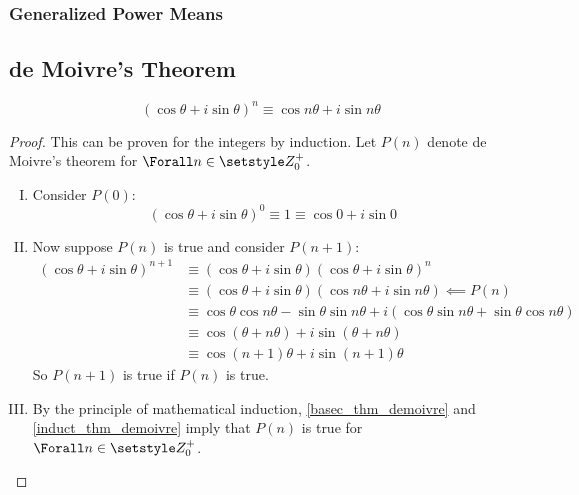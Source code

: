 \subsubsection{Generalized Power Means}

\subsection{de Moivre's Theorem}

\begin{theorem}
 \begin{equation*}
  (\cos \theta + i \sin \theta)^n \equiv \cos n\theta + i \sin n\theta
 \end{equation*}
\end{theorem}
\begin{proof}
 This can be proven for the integers by induction. Let \(P(n)\) denote de
 Moivre's theorem for \(\Forall n \in \Integers_0^+\).
 \begin{enumerate}[I.]
  \item \label{basec_thm_demoivre} Consider \(P(0)\):
        \begin{equation*}
         (\cos \theta + i \sin \theta)^0 \equiv 1 \equiv \cos 0 + i \sin 0
        \end{equation*}
  \item \label{induct_thm_demoivre} Now suppose \(P(n)\) is true and consider
        \(P(n + 1)\):
        \begin{align*}
         (\cos \theta + i \sin \theta)^{n + 1} &\equiv
          (\cos \theta + i \sin \theta)(\cos \theta + i \sin \theta)^n \\
          &\equiv (\cos \theta + i \sin \theta)
                  (\cos n\theta + i \sin n\theta) \impliedby P(n) \\
          &\equiv \cos \theta \cos n\theta - \sin \theta \sin n\theta
                + i(\cos \theta \sin n\theta + \sin \theta \cos n\theta) \\
          &\equiv \cos(\theta + n\theta) + i \sin(\theta + n\theta) \\
          &\equiv \cos (n + 1)\theta + i \sin (n + 1)\theta
        \end{align*}
        So \(P(n + 1)\) is true if \(P(n)\) is true.
  \item By the principle of mathematical induction, \ref{basec_thm_demoivre} and
        \ref{induct_thm_demoivre} imply that \(P(n)\) is true for
        \(\Forall n \in \Integers_0^+\).
 \end{enumerate}
\end{proof}

